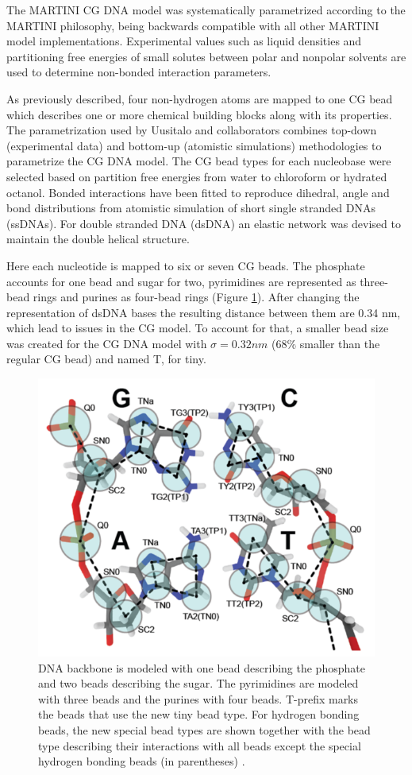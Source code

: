 \documentclass[
	12pt,				%
	openright,			%
	twoside,			%
	a4paper,			%
	english,			%
	french,				%
	spanish,			%
	brazil,				%
	]{abntex2}
\begin{document}
The MARTINI CG DNA model was systematically parametrized according to the MARTINI philosophy, being backwards compatible with all other MARTINI model implementations. Experimental values such as liquid densities and partitioning free energies of small solutes between polar and nonpolar solvents are used to determine non-bonded interaction parameters\cite{Uusitalo2015}.

As previously described, four non-hydrogen atoms are mapped to one CG bead which describes one or more chemical building blocks along with its properties. The parametrization used by Uusitalo and collaborators combines top-down (experimental data) and bottom-up (atomistic simulations) methodologies to parametrize the CG DNA model. The CG bead types for each nucleobase were selected based on partition free energies from water to chloroform or hydrated octanol. Bonded interactions have been fitted to reproduce dihedral, angle and bond distributions from atomistic simulation of short single stranded DNAs (ssDNAs). For double stranded DNA (dsDNA) an elastic network was devised to maintain the double helical structure.
	
Here each nucleotide is mapped to six or seven CG beads. The phosphate accounts for one bead and sugar for two, pyrimidines are represented as three-bead rings and purines as four-bead rings (Figure \ref{fig:dnacg}). After changing the representation of dsDNA bases the resulting distance between them are 0.34 nm, which lead to issues in the CG model. To account for that, a smaller bead size was created for the CG DNA model with $\sigma = 0.32nm$ (68\% smaller than the regular CG bead) and named T, for tiny. 

\begin{figure}
	\centering
	\includegraphics[width=0.7\linewidth]{figures/dna_cg}
	\caption{DNA backbone is modeled with one bead describing the phosphate and two beads describing the sugar. The pyrimidines are modeled with three beads and the purines with four beads. T-prefix marks the beads that use the new tiny bead type. For hydrogen bonding beads, the new special bead types are shown together with the bead type describing their interactions with all beads except the special hydrogen bonding beads (in parentheses) \cite{Uusitalo2015}.}
	\label{fig:dnacg}
\end{figure}
\end{document}
